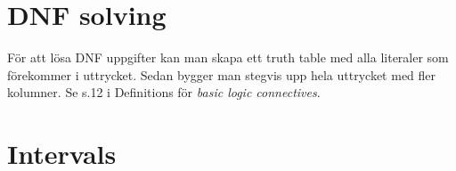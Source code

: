 \documentclass[twocolumn,a4paper]{article}
\begin{document}
\section*{DNF solving}
För att lösa DNF uppgifter kan man skapa ett truth table med alla literaler som förekommer i uttrycket.
Sedan bygger man stegvis upp hela uttrycket med fler kolumner.
Se s.12 i Definitions för \emph{basic logic connectives}.
\begin{figure}[ht]
	\centering
\end{figure}

\newpage
\section*{Intervals}
\end{document}
